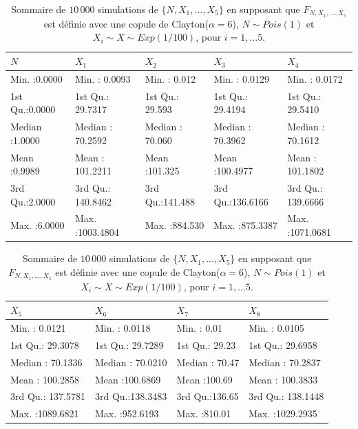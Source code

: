 \documentclass{article}
\begin{document}
		\begin{table}[H]
			\centering
			\begin{tabular}{lllll}
				\hline
				       $N$ &      $X_1$ &      $X_2$ &       $X_3$ &       $X_4$ \\
				\hline
				 Min.   :0.0000   & Min.   :   0.0093   & Min.   :  0.012   & Min.   :  0.0129   & Min.   :   0.0172 \\
				 1st Qu.:0.0000   & 1st Qu.:  29.7317   & 1st Qu.: 29.593   & 1st Qu.: 29.4194   & 1st Qu.:  29.5410 \\
				 Median :1.0000   & Median :  70.2592   & Median : 70.060   & Median : 70.3962   & Median :  70.1612 \\
				 Mean   :0.9989   & Mean   : 101.2211   & Mean   :101.325   & Mean   :100.4977   & Mean   : 101.1802 \\
				 3rd Qu.:2.0000   & 3rd Qu.: 140.8462   & 3rd Qu.:141.488   & 3rd Qu.:136.6166   & 3rd Qu.: 139.6666 \\
				 Max.   :6.0000   & Max.   :1003.4804   & Max.   :884.530   & Max.   :875.3387   & Max.   :1071.0681 \\
				\hline
			\end{tabular}
	
			\begin{tabular}{llll}
				\hline
				$X_5$ &      $X_6$ &       $X_7$ &       $X_8$ \\ 
				\hline
				Min.   :   0.0121   & Min.   :  0.0118   & Min.   :  0.01   & Min.   :   0.0105   \\ 
				1st Qu.:  29.3078   & 1st Qu.: 29.7289   & 1st Qu.: 29.23   & 1st Qu.:  29.6958   \\ 
				Median :  70.1336   & Median : 70.0210   & Median : 70.47   & Median :  70.2837   \\ 
				Mean   : 100.2858   & Mean   :100.6869   & Mean   :100.69   & Mean   : 100.3833   \\ 
				3rd Qu.: 137.5781   & 3rd Qu.:138.3483   & 3rd Qu.:136.65   & 3rd Qu.: 138.1448   \\ 
				Max.   :1089.6821   & Max.   :952.6193   & Max.   :810.01   & Max.   :1029.2935   \\ 
				\hline
		\end{tabular}
		\caption[Sommaire des données simulées pour le scénario \ref{scenario_Clayton_Pois}]{Sommaire de $10\,000$ simulations de $\{N, X_1, \dots, X_5\}$ en supposant que $F_{N,X_1,\dots, X_5}$ est définie avec une copule de Clayton($\alpha=6$), $N \sim Pois(1)$ et $X_i \sim X \sim Exp(1/100)$, pour $i=1,\dots 5$.}\label{tbl_sommaire_Clayton_Pois_1}
		\end{table}
		
\end{document}
